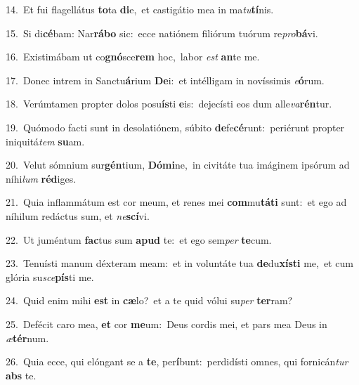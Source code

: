 {\numbfont\textcolor{\numbcolor}{14.}}~Et fui flagellátus \textbf{to}\-ta \textbf{di}\-e,~\star et castigátio mea in ma\-\textit{tu}\-\textbf{tí}nis.\par
{\numbfont\textcolor{\numbcolor}{15.}}~Si di\-\textbf{cé}\-bam: Nar\-\textbf{rá}\-\textbf{bo} sic:~\star ecce natiónem filiórum tuórum re\-\textit{pro}\-\textbf{bá}vi.\par
{\numbfont\textcolor{\numbcolor}{16.}}~Existimábam ut co\-\textbf{gnó}\-sce\textbf{rem} hoc,~\star labor \textit{est} \textbf{an}\-te me.\par
{\numbfont\textcolor{\numbcolor}{17.}}~Donec intrem in Sanctu\-\textbf{á}\-rium \textbf{De}\-i:~\star et intélligam in novíssimis \textit{e}\-\textbf{ó}rum.\par
{\numbfont\textcolor{\numbcolor}{18.}}~Verúmtamen propter dolos posu\-\textbf{ís}\-ti \textbf{e}\-is:~\star dejecísti eos dum alle\-\textit{va}\-\textbf{rén}tur.\par
{\numbfont\textcolor{\numbcolor}{19.}}~Quómodo facti sunt in desolatiónem, súbito \textbf{de}\-fe\-\textbf{cé}\-runt:~\star periérunt propter iniquitá\textit{tem} \textbf{su}\-am.\par
{\numbfont\textcolor{\numbcolor}{20.}}~Velut sómnium sur\-\textbf{gén}\-tium, \textbf{Dó}\-\textbf{mi}ne,~\star in civitáte tua imáginem ipsórum ad níhi\textit{lum} \textbf{réd}\-iges.\par
{\numbfont\textcolor{\numbcolor}{21.}}~Quia inflammátum est cor meum, et renes mei \textbf{com}\-mu\-\textbf{tá}\-\textbf{ti} sunt:~\star et ego ad níhilum redáctus sum, et \textit{ne}\-\textbf{scí}vi.\par
{\numbfont\textcolor{\numbcolor}{22.}}~Ut juméntum \textbf{fac}\-tus sum \textbf{a}\-\textbf{pud} te:~\star et ego sem\textit{per} \textbf{te}\-cum.\par
{\numbfont\textcolor{\numbcolor}{23.}}~Tenuísti manum déxteram meam:~\dagger et in voluntáte tua \textbf{de}\-du\-\textbf{xís}\-\textbf{ti} me,~\star et cum glória su\-\textit{sce}\-\textbf{pís}ti me.\par
{\numbfont\textcolor{\numbcolor}{24.}}~Quid enim mihi \textbf{est} in \textbf{cæ}\-lo?~\star et a te quid vólui su\textit{per} \textbf{ter}\-ram?\par
{\numbfont\textcolor{\numbcolor}{25.}}~Defécit caro mea, \textbf{et} cor \textbf{me}\-um:~\star Deus cordis mei, et pars mea Deus in \textit{æ}\-\textbf{tér}num.\par
{\numbfont\textcolor{\numbcolor}{26.}}~Quia ecce, qui elóngant se a \textbf{te}\-, per\-\textbf{í}\-bunt:~\star perdidísti omnes, qui fornicán\textit{tur} \textbf{abs} te.\par

